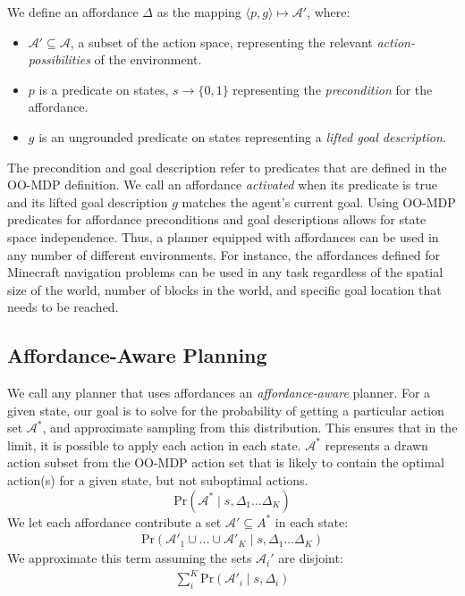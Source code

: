 \documentclass[conference]{IEEEtran}
\begin{document}
We define an affordance $\Delta$ 
as the mapping $\langle p,g\rangle \longmapsto \mathcal{A}'$,
where:
\begin{itemize}
\item[] $\mathcal{A}' \subseteq \mathcal{A}$, a subset of the action space, representing the relevant {\it action-possibilities} of the environment.
\item[] $p$ is a predicate on states, $s \longrightarrow \{$0$, 1\}$
  representing the {\em precondition} for the affordance.
\item[] $g$ is an ungrounded predicate on states representing a {\it lifted goal description}.
\end{itemize}
The precondition and goal description refer to predicates that are defined in the OO-MDP definition.
We call an affordance {\it activated} when its predicate is true and its lifted goal description $g$ matches the agent's current goal. 
Using OO-MDP predicates for affordance preconditions and goal descriptions 
allows for state space independence. Thus, a planner equipped with
affordances can be used in any number of different environments. For instance, the affordances defined for Minecraft 
navigation problems can be used in any task regardless of the spatial size of the world, 
number of blocks in the world, and specific goal location that needs to be reached.

\subsection{Affordance-Aware Planning}
We call any planner that
uses affordances an {\it affordance-aware} planner. For a given state, 
our goal is to solve for the probability of getting a particular action set $\mathcal{A}^*$, and approximate sampling
from this distribution. This ensures that in the limit, it is possible to apply each action in each state. $\mathcal{A}^*$ represents
a drawn action subset from the OO-MDP action set that is likely to contain the optimal action(s) for a given state,
but not suboptimal actions.
\begin{equation}
\text{Pr}(\mathcal{A}^* \mid s, \Delta_1 \dots \Delta_K)
\end{equation}
We let each affordance contribute a set $\mathcal{A}' \subseteq A^*$ in each state:
\begin{align}
\text{Pr}(\mathcal{A}'_1 \cup \ldots \cup \mathcal{A}'_K \mid s, \Delta_1 \dots \Delta_K)
\end{align}
We approximate this term assuming the sets $\mathcal{A}_i'$ are disjoint:
\begin{align}
\sum_i^K \text{Pr}(\mathcal{A}'_i \mid s, \Delta_i)
\end{align}
\end{document}
